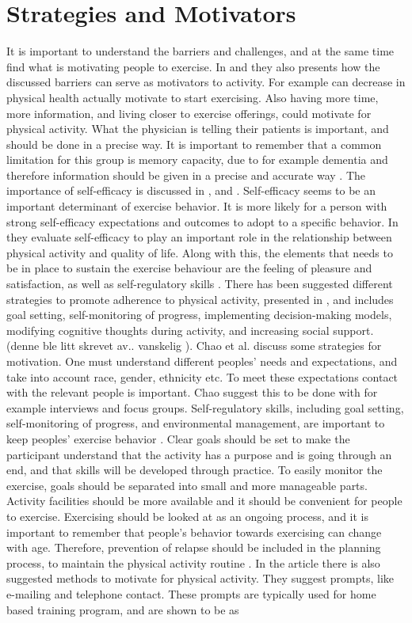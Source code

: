\section{Strategies and Motivators}
It is important to understand the barriers and challenges, and at the same time find what is motivating people to exercise. In \cite{schutzer} and \cite{chao} they also presents how the discussed barriers can serve as motivators to activity. For example can decrease in physical health actually motivate to start exercising. Also having more time, more information, and living closer to exercise offerings, could motivate for physical activity. What the physician is telling their patients is important, and should be done in a precise way. It is important to remember that a common limitation for this group is memory capacity, due to for example dementia and therefore information should be given in a precise and accurate way \cite{chao}.  The importance of self-efficacy is discussed in \cite{schutzer}, \cite{chao} and \cite{white}. Self-efficacy seems to be an important determinant of exercise behavior. It is more likely for a person with strong self-efficacy expectations and outcomes to adopt to a specific behavior. In \cite{white} they evaluate self-efficacy to play an important role in the relationship between physical activity and quality of life. Along with this, the elements that needs to be in place to sustain  the exercise behaviour are the feeling of pleasure and satisfaction, as well as self-regulatory skills \cite{schutzer}. There has been suggested different strategies to promote adherence to physical activity, presented in \cite{chao}, and includes goal setting, self-monitoring of progress, implementing decision-making models, modifying cognitive thoughts during activity, and increasing social support. (denne ble litt skrevet av.. vanskelig \cite{chao}). Chao et al. \cite{chao} discuss some strategies for motivation.  One must understand different peoples' needs and expectations, and take into account race, gender, ethnicity etc.  To meet these expectations contact with the relevant people is important. Chao suggest this to be done with for example interviews and focus groups.  Self-regulatory skills, including goal setting, self-monitoring of progress, and environmental management, are important to keep peoples' exercise behavior \cite{chao}. Clear goals should be set to make the participant understand that the activity has a purpose and is going through an end, and that skills will be developed through practice. To easily monitor the exercise, goals should be separated into small and more manageable parts. Activity facilities should be more available and it should be convenient for people to exercise. Exercising should be looked at as an ongoing process, and it is important to remember that people's behavior towards exercising can change with age. Therefore, prevention of relapse should be included in the planning process, to maintain the physical activity routine \cite{chao}. In the article \cite{schutzer} there is also suggested methods to motivate for physical activity. They suggest prompts, like e-mailing and telephone contact. These prompts are typically used for home based training program, and are shown to be as 